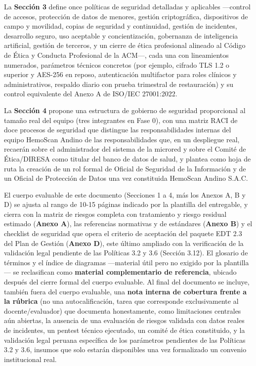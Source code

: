 \documentclass[11pt,a4paper]{article}
\begin{document}
La \textbf{Sección 3} define once políticas de seguridad detalladas y aplicables ---control de accesos, protección de datos de menores, gestión criptográfica, dispositivos de campo y movilidad, copias de seguridad y continuidad, gestión de incidentes, desarrollo seguro, uso aceptable y concientización, gobernanza de inteligencia artificial, gestión de terceros, y un cierre de ética profesional alineado al Código de Ética y Conducta Profesional de la ACM---, cada una con lineamientos numerados, parámetros técnicos concretos (por ejemplo, cifrado TLS 1.2 o superior y AES-256 en reposo, autenticación multifactor para roles clínicos y administrativos, respaldo diario con prueba trimestral de restauración) y su control equivalente del Anexo A de ISO/IEC 27001:2022.

La \textbf{Sección 4} propone una estructura de gobierno de seguridad proporcional al tamaño real del equipo (tres integrantes en Fase 0), con una matriz RACI de doce procesos de seguridad que distingue las responsabilidades internas del equipo HemoScan Andino de las responsabilidades que, en un despliegue real, recaerán sobre el administrador del sistema de la microred y sobre el Comité de Ética/DIRESA como titular del banco de datos de salud, y plantea como hoja de ruta la creación de un rol formal de Oficial de Seguridad de la Información y de un Oficial de Protección de Datos una vez constituida HemoScan Andino S.A.C.

El cuerpo evaluable de este documento (Secciones 1 a 4, más los Anexos A, B y D) se ajusta al rango de 10-15 páginas indicado por la plantilla del entregable, y cierra con la matriz de riesgos completa con tratamiento y riesgo residual estimado (\textbf{Anexo A}), las referencias normativas y de estándares (\textbf{Anexo B}) y el checklist de seguridad que opera el criterio de aceptación del paquete EDT 2.3 del Plan de Gestión (\textbf{Anexo D}), este último ampliado con la verificación de la validación legal pendiente de las Políticas 3.2 y 3.6 (Sección 3.12). El glosario de términos y el índice de diagramas ---material útil pero no exigido por la plantilla--- se reclasifican como \textbf{material complementario de referencia}, ubicado después del cierre formal del cuerpo evaluable. Al final del documento se incluye, también fuera del cuerpo evaluable, una \textbf{nota interna de cobertura frente a la rúbrica} (no una autocalificación, tarea que corresponde exclusivamente al docente/evaluador) que documenta honestamente, como limitaciones centrales aún abiertas, la ausencia de una evaluación de riesgos validada con datos reales de incidentes, un pentest técnico ejecutado, un comité de ética constituido, y la validación legal peruana específica de los parámetros pendientes de las Políticas 3.2 y 3.6, insumos que solo estarán disponibles una vez formalizado un convenio institucional real.
\end{document}
